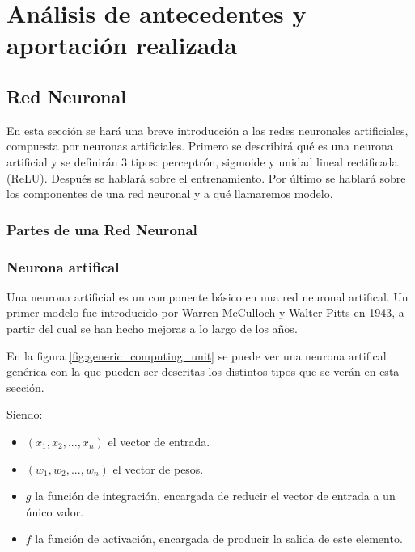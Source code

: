 \chapter{An\'alisis de antecedentes y aportaci\'on realizada}\label{analanteced}


\section{Red Neuronal}\label{sec:redneuronal}
En esta sección se hará una breve introducción a las redes neuronales artificiales, compuesta por neuronas artificiales. Primero se describirá qué es una neurona artificial y se definirán 3 tipos: perceptrón, sigmoide y unidad lineal rectificada (ReLU). Después se hablará sobre el entrenamiento. Por último se hablará sobre los componentes de una red neuronal y a qué llamaremos modelo.
\subsection{Partes de una Red Neuronal}\label{subsec:nn_partes}

\subsection{Neurona artifical}\label{subsec:neurona_artificial}

Una neurona artificial es un componente básico en una red neuronal artifical. Un primer modelo fue introducido por Warren McCulloch y Walter Pitts en 1943, a partir del cual se han hecho mejoras a lo largo de los años. \cite[Chapter~1]{Rojas1996}

En la figura \ref{fig:generic_computing_unit} se puede ver una neurona artifical genérica con la que pueden ser descritas los distintos tipos que se verán en esta sección.


Siendo:
\begin{itemize}
\item $ (x_1, x_2, ...,x_n) $ el vector de entrada.
\item $ (w_1, w_2, ...,w_n) $ el vector de pesos.
\item $ g $ la función de integración, encargada de reducir el vector de entrada a un único valor.
\item $ f $ la función de activación, encargada de producir la salida de este elemento.
\end{itemize}

